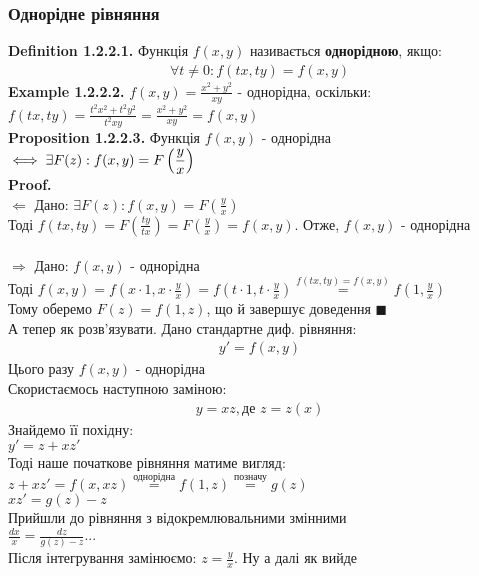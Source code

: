 \documentclass[a4paper, 14pt]{extarticle}
\def\huge{\displaystyle}
\def\defin#1{\textbf{Definition {#1}}}
\def\ex#1{\textbf{Example {#1}}}
\def\prp#1{\textbf{Proposition {#1}}}
\def\proof{\textbf{Proof.}\\}
\def\bigline{\vspace{5mm}\\}
\def\qed{$\blacksquare$}
\begin{document}
	\subsubsection{Однорідне рівняння}
	\defin{1.2.2.1.} Функція $f(x,y)$ називається \textbf{однорідною}, якщо:
	\begin{align*}
	\forall t \neq 0: f(tx, ty)=f(x,y)
	\end{align*}
	\ex{1.2.2.2.} $\huge f(x,y) = \frac{x^2+y^2}{xy}$ - однорідна, оскільки:\\
	$\huge f(tx, ty) = \frac{t^2x^2+t^2y^2}{t^2xy} = \frac{x^2+y^2}{xy} = f(x,y)$
	\bigline
	\prp{1.2.2.3.} Функція $f(x,y)$ - однорідна $\iff \huge \exists F(z): \\f(x,y)=F\left(\frac{y}{x}\right)$\\
	\proof
	$\boxed{\Leftarrow}$ Дано: $\huge \exists F(z): f(x,y)=F\left(\frac{y}{x}\right)$\\
	Тоді $\huge f(tx,ty) = F\left(\frac{ty}{tx} \right) = F\left(\frac{y}{x} \right) = f(x,y)$. Отже, $f(x,y)$ - однорідна\\
	\\
	$\boxed{\Rightarrow}$ Дано: $f(x,y)$ - однорідна\\
	Тоді $\huge f(x,y) = f\left(x\cdot1, x \cdot \frac{y}{x} \right) = f\left(t\cdot1, t \cdot \frac{y}{x} \right) \overset{f(tx,ty)=f(x,y)}{=} f\left(1, \frac{y}{x}\right)$\\
	Тому оберемо $F(z) = f(1,z)$, що й завершує доведення \qed
	\bigline
	А тепер як розв'язувати. Дано стандартне диф. рівняння:
	\begin{align*}
	y'=f(x,y)
	\end{align*}
	Цього разу $f(x,y)$ - однорідна\\
	Скористаємось наступною заміною:
	\begin{align*}
	y=xz, \textrm{де } z=z(x)
	\end{align*}
	Знайдемо її похідну:\\
	$y' = z + xz'$\\
	Тоді наше початкове рівняння матиме вигляд:\\
	$\huge z+xz'=f(x, xz) \overset{\textrm{однорідна}}{=} f(1,z) \overset{\textrm{позначу}}{=}g(z)$\\
	$xz'=g(z)-z$\\
	Прийшли до рівняння з відокремлювальними змінними\\
	$\huge \frac{dx}{x} = \frac{dz}{g(z)-z} ...$\\
	Після інтегрування замінюємо: $\huge z = \frac{y}{x}$. Ну а далі як вийде
\end{document}

